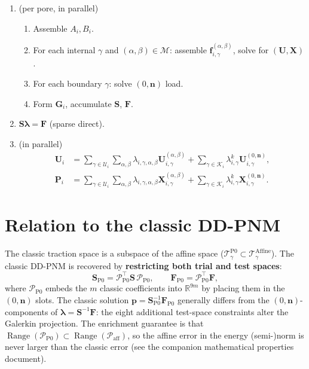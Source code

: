 \documentclass[11pt,a4paper]{article}
\newcommand{\R}{\mathbb{R}}
\newcommand{\normal}{\bm{n}}
\newcommand{\trac}{\bm{\lambda}}
\newcommand{\DtN}{\mathbf{G}}
\newcommand{\Schur}{\mathbf{S}}
\newcommand{\modeset}{\mathcal{M}}
\begin{document}
\begin{enumerate}[nosep,leftmargin=*,font=\bfseries]
  \item[\bfseries 1.~Offline library] (per pore, in parallel)
    \begin{enumerate}[nosep,leftmargin=*]
      \item Assemble $A_i,B_i$.
      \item For each internal $\gamma$ and $(\alpha,\beta)\in\modeset$:
        assemble $\bm{f}_{i,\gamma}^{(\alpha,\beta)}$,
        solve for $(\mathbf{U},\mathbf{X})$.
      \item For each boundary $\gamma$: solve $(0,\normal)$ load.
      \item Form $\DtN_i$, accumulate $\Schur$, $\bm{F}$.
    \end{enumerate}
  \item[\bfseries 2.~Global solve] $\Schur\trac = \bm{F}$ (sparse direct).
  \item[\bfseries 3.~Reconstruction] (in parallel)
    \begin{align*}
      \mathbf{U}_i &= \sum_{\gamma\in\mathcal{U}_i}\sum_{\alpha,\beta}
        \lambda_{i,\gamma,\alpha,\beta}\mathbf{U}_{i,\gamma}^{(\alpha,\beta)}
        + \sum_{\gamma\in\mathcal{K}_i}\lambda_{i,\gamma}^k
        \mathbf{U}_{i,\gamma}^{(0,\normal)},\\
      \mathbf{P}_i &= \sum_{\gamma\in\mathcal{U}_i}\sum_{\alpha,\beta}
        \lambda_{i,\gamma,\alpha,\beta}\mathbf{X}_{i,\gamma}^{(\alpha,\beta)}
        + \sum_{\gamma\in\mathcal{K}_i}\lambda_{i,\gamma}^k
        \mathbf{X}_{i,\gamma}^{(0,\normal)}.
    \end{align*}
\end{enumerate}

\section{Relation to the classic DD-PNM}
\label{sec:reduction}

The classic traction space is a subspace of the affine space
($\mathcal{T}_\gamma^{\text{P0}} \subset \mathcal{T}_\gamma^{\text{Affine}}$).
The classic DD-PNM is recovered by \textbf{restricting both trial and test
spaces}:
\[
  \Schur_{\text{P0}} = \mathcal{P}_{\text{P0}}^\top \Schur\,
                       \mathcal{P}_{\text{P0}},\qquad
  \bm{F}_{\text{P0}} = \mathcal{P}_{\text{P0}}^\top \bm{F},
\]
where $\mathcal{P}_{\text{P0}}$ embeds the $m$ classic coefficients into
$\R^{9m}$ by placing them in the $(0,\normal)$ slots.
The classic solution $\bm{p} = \Schur_{\text{P0}}^{-1}\bm{F}_{\text{P0}}$
generally differs from the $(0,\normal)$-components of
$\trac = \Schur^{-1}\bm{F}$: the eight additional test-space constraints
alter the Galerkin projection.  The enrichment guarantee is that
$\operatorname{Range}(\mathcal{P}_{\text{P0}}) \subset
\operatorname{Range}(\mathcal{P}_{\text{aff}})$, so the affine error in
the energy (semi-)norm is never larger than the classic error
(see the companion mathematical properties document).
\end{document}
